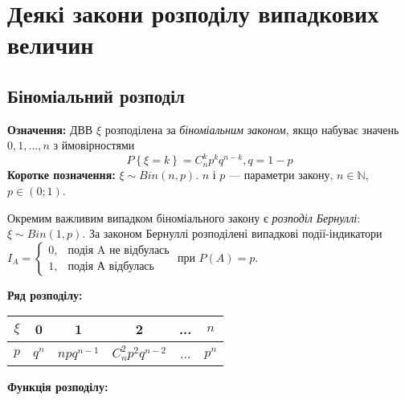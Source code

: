 \section{Деякі закони розподілу випадкових величин}

\subsection{Біноміальний розподіл}
\noindent\textbf{Означення:}
    ДВВ $\xi$ розподілена за \emph{біноміальним законом}, 
    якщо набуває значень $0,1,...,n$ з ймовірностями \begin{equation}
        P\left\{\xi = k\right\} = C_n^k p^k q^{n-k}, q = 1 - p
    \end{equation}
\textbf{Коротке позначення:} $\xi \sim {Bin}(n, p)$.
    $n$ і $p$ --- параметри закону, $n\in \mathbb{N}$, $p\in (0;1)$.

Окремим важливим випадком біноміального закону є \emph{розподіл Бернуллі}: $\xi \sim {Bin}(1, p)$.
За законом Бернуллі розподілені випадкові події-індикатори $I_A = \begin{cases}
    0, & \text{подія A не відбулась}\\ 1, & \text{подія А відбулась}
\end{cases}$ при $P(A) = p$.

\noindent\textbf{Ряд розподілу:}

\begin{tabular}{c|c|c|c|c|c}
    $\xi$ & 0 & 1 & 2 & ... & $n$ \\
    \hline
    $p$ & $q^n$ & $npq^{n-1}$ & $C_n^2 p^2 q^{n-2}$ & ... & $p^n$
\end{tabular}

\noindent\textbf{Функція розподілу:}

